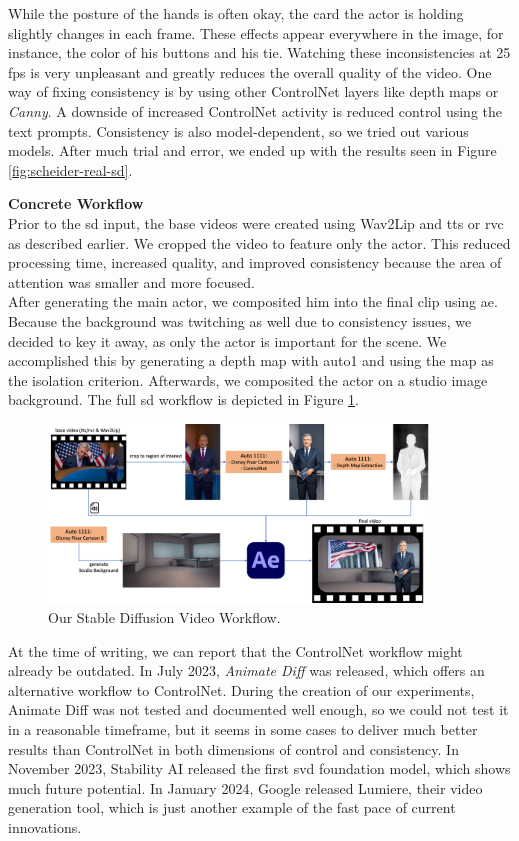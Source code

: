 \documentclass[
  a4paper,  %
  twoside,  %
  bibliography=totoc,
  headsepline,
  cleardoublepage=empty,
  parskip=half,
  draft=false
]{scrbook}
\begin{document}
While the posture of the hands is often okay, the card the actor is holding slightly changes in each frame. These effects appear everywhere in the image, for instance, the color of his buttons and his tie. Watching these inconsistencies at 25 \gls{fps} is very unpleasant and greatly reduces the overall quality of the video. One way of fixing consistency is by using other ControlNet layers like depth maps or \textit{Canny}. A downside of increased ControlNet activity is reduced control using the text prompts. Consistency is also model-dependent, so we tried out various models. After much trial and error, we ended up with the results seen in Figure \ref{fig:scheider-real-sd}.

\textbf{Concrete Workflow} \\
Prior to the \gls{sd} input, the base videos were created using Wav2Lip and \gls{tts} or \gls{rvc} as described earlier. We cropped the video to feature only the actor. This reduced processing time, increased quality, and improved consistency because the area of attention was smaller and more focused. \\
After generating the main actor, we composited him into the final clip using \gls{ae}. Because the background was  twitching as well due to consistency issues, we decided to key it away, as only the actor is important for the scene. We accomplished this by generating a depth map with \gls{auto1} and using the map as the isolation criterion. Afterwards, we composited the actor on a studio image background. The full \gls{sd} workflow is depicted in Figure \ref{fig:sd-full-workflow}.

\begin{figure}[h]
  \centering
  \includegraphics[width=0.9\textwidth]{./graphics/diffusion/sd-workflow.png}
  \caption{Our Stable Diffusion Video Workflow.}
  \label{fig:sd-full-workflow}
\end{figure}

At the time of writing, we can report that the ControlNet workflow might already be outdated. In July 2023, \textit{Animate Diff} was released, which offers an alternative workflow to ControlNet. During the creation of our experiments, Animate Diff was not tested and documented well enough, so we could not test it in a reasonable timeframe, but it seems in some cases to deliver much better results than ControlNet in both dimensions of control and consistency. In November 2023, Stability AI released the first \gls{svd} foundation model, which shows much future potential. In January 2024, Google released Lumiere, their video generation tool, which is just another example of the fast pace of current innovations.
\end{document}
